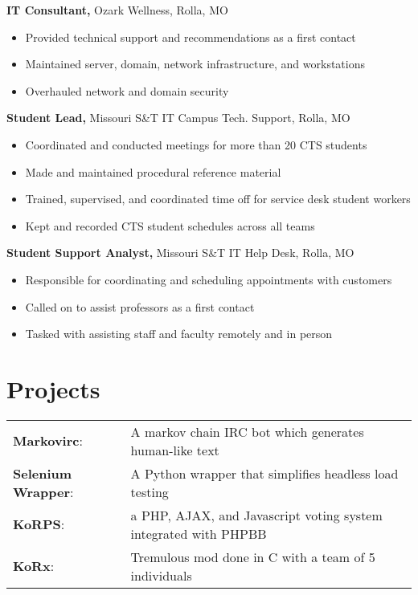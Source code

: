 \documentclass[margin]{res}
\begin{document}
\begin{resume}
     {\bf IT Consultant,} Ozark Wellness, Rolla, MO%
       \begin{itemize} \itemsep -1pt  %
         \item Provided technical support and recommendations as a first contact
         \item Maintained server, domain, network infrastructure, and workstations
         \item Overhauled network and domain security
       \end{itemize}

     {\bf Student Lead,}  Missouri S\&T IT Campus Tech. Support, Rolla, MO%
       \begin{itemize} \itemsep -1pt  %
         \item Coordinated and conducted meetings for more than 20 CTS students
         \item Made and maintained procedural reference material
         \item Trained, supervised, and coordinated time off for service desk student workers
         \item Kept and recorded CTS student schedules across all teams
       \end{itemize}
     
     {\bf Student Support Analyst,} Missouri S\&T IT Help Desk, Rolla, MO%
       \begin{itemize} \itemsep -1pt  %
         \item Responsible for coordinating and scheduling appointments with customers
         \item Called on to assist professors as a first contact
         \item Tasked with assisting staff and faculty remotely and in person
       \end{itemize}

    \section{Projects} 
      \begin{tabular}{l p{4in}}
        \textbf{Markovirc}: & A markov chain IRC bot which generates human-like text \\ [1pt]
        \textbf{Selenium Wrapper}: & A Python wrapper that simplifies headless load testing \\ [1pt]
        \textbf{KoRPS}: & a PHP, AJAX, and Javascript voting system integrated with PHPBB \\ [1pt]
        \textbf{KoRx}: & Tremulous mod done in C with a team of 5 individuals \\ [1pt]
      \end{tabular}


\end{resume}
\end{document}
